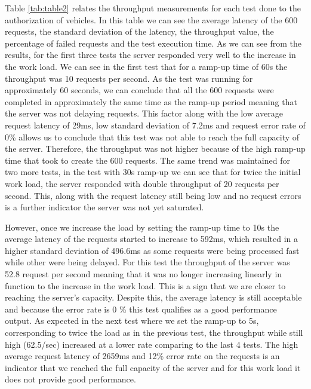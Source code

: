 	Table \ref{tab:table2} relates the throughput measurements for each test done to the authorization of vehicles. In this table we can see the average latency of the 600 requests, the standard deviation of the latency, the throughput value, the percentage of failed requests and the test execution time. As we can see from the results, for the first three tests the server responded very well to the increase in the work load. We can see in the first test that for a ramp-up time of 60s the throughput was 10 requests per second. As the test was running for approximately 60 seconds, we can conclude that all the 600 requests were completed in approximately the same time as the ramp-up period meaning that the server was not delaying requests. This factor along with the low average request latency of 29ms, low standard deviation of 7.2ms and request error rate of 0\% allows us to conclude that this test was not able to reach the full capacity of the server. Therefore, the throughput was not higher because of the high ramp-up time that took to create the 600 requests. The same trend was maintained for two more tests, in the test with 30s ramp-up we can see that for twice the initial work load, the server responded with double throughput of 20 requests per second. This, along with the request latency still being low and no request errors is a further indicator the server was not yet saturated.
	
	However, once we increase the load by setting the ramp-up time to 10s the average latency of the requests started to increase to 592ms, which resulted in a higher standard deviation of 496.6ms as some requests were being processed fast while other were being delayed. For this test the throughput of the server was 52.8 request per second meaning that it was no longer increasing linearly in function to the increase in the work load. This is a sign that we are closer to reaching the server's capacity. Despite this, the average latency is still acceptable and because the error rate is 0 \% this test qualifies as a good performance output. As expected in the next test where we set the ramp-up to 5s, corresponding to twice the load as in the previous test, the throughput while still high (62.5/sec) increased at a lower rate comparing to the last 4 tests. The high average request latency of 2659ms and 12\% error rate on the requests is an indicator that we reached the full capacity of the server and for this work load it does not provide good performance.
	
